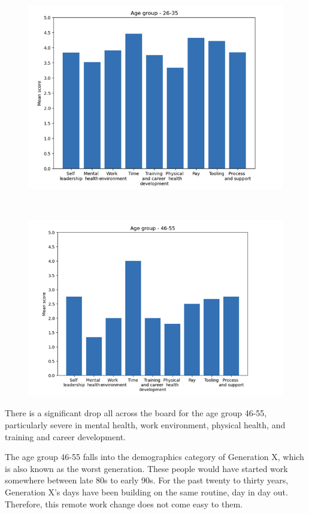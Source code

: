 \documentclass[12pt]{article}
\begin{document}
\begin{figure}[h]
    \centering
    \includegraphics[scale=1]{26.png}
    \label{26}
\end{figure} \\

\begin{figure}[h]
    \centering
    \includegraphics[scale=1]{46.png}
    \label{46}
\end{figure} 

There is a significant drop all across the board for the age group 46-55, particularly severe in mental health, work environment, physical health, and training and career development.

The age group 46-55 falls into the demographics category of Generation X, which is also known as the worst generation. These people would have started work somewhere between late 80s to early 90s. For the past twenty to thirty years, Generation X’s days have been building on the same routine, day in day out. Therefore, this remote work change does not come easy to them.
\end{document}
